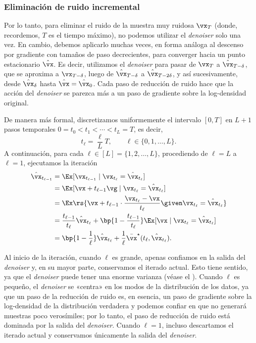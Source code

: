 \documentclass[../../book-main.tex]{subfiles}
\begin{document}
\subsubsection{Eliminación de ruido incremental}
Por lo tanto, para eliminar el ruido de la muestra muy ruidosa \(\vx_{T}\) (donde,
recordemos, \(T\) es el tiempo máximo), no podemos utilizar el \textit{denoiser} solo
una vez. En cambio, debemos aplicarlo muchas veces, en forma análoga al descenso por gradiente
con tamaños de paso decrecientes, para converger hacia un punto estacionario
\(\hat{\vx}\). Es decir, utilizamos el \textit{denoiser} para pasar de \(\vx_{T}\) a
\(\hat{\vx}_{T - \delta}\), que se aproxima a \(\vx_{T - \delta}\),
luego de \(\hat{\vx}_ {T - \delta}\) a \(\hat{\vx}_{T - 2\delta}\),
y así sucesivamente, desde \(\hat{\vx}_{\delta}\) hasta \(\hat{\vx} =
\hat{\vx}_{0}\). Cada paso de reducción de ruido hace que la acción del \textit{denoiser} 
se parezca más a un paso de gradiente sobre la log-densidad original.

De manera más formal, discretizamos uniformemente el intervalo \([0, T]\) en \(L + 1\)
pasos temporales \(0 = t_{0} < t_{1} < \cdots < t_{L} = T\), es decir,
\begin{equation}
    t_{\ell} = \frac{\ell}{L}T, \qquad \ell \in \{0, 1, \dots, L\}.
\end{equation}
A continuación, para cada \(\ell \in [L] = \{1, 2, \dots, L\}\), procediendo de
\(\ell = L\) a \(\ell = 1\), ejecutamos la iteración
\begin{align}
    \hat{\vx}_{t_{\ell - 1}}
    &= \Ex[\vx_{t_{\ell - 1}} \mid \vx_{t_{\ell}} = \hat{\vx}_{t_{\ell}}] \\
    &= \Ex[\vx + t_{\ell - 1}\vg \mid \vx_{t_{\ell}} = \hat{\vx}_{t_{\ell}}] \\
    &= \Ex\rs{\vx + t_{\ell - 1}\cdot\frac{\vx_{t_{\ell}} -
    \vx}{t_{\ell}} \given \vx_{t_{\ell}} = \hat{\vx}_{t_{\ell}}} \\
    &= \frac{t_{\ell - 1}}{t_{\ell}}\hat{\vx}_{t_{\ell}} + \bp{1 -
    \frac{t_{\ell - 1}}{t_{\ell}}}\Ex[\vx \mid \vx_{t_{\ell}} =
    \hat{\vx}_{t_{\ell}}] \\
    &= \bp{1 - \frac{1}{\ell}} \hat{\vx}_{t_{\ell}} + \frac{1}{\ell}
    \bar{\vx}^{\star}(t_{\ell}, \hat{\vx}_{t_{\ell}}). \label{eq:iter denoise}
\end{align}

Al inicio de la iteración, cuando \(\ell\) es grande, apenas
confiamos en la salida del \textit{denoiser} y, en su mayor parte, conservamos el iterado actual.
Esto tiene sentido, ya que el \textit{denoiser} puede tener una enorme varianza (véase
el ). Cuando \(\ell\) es pequeño, el
\textit{denoiser} se «centra» en los modos de la distribución de los datos, ya que un
paso de la reducción de ruido es, en esencia, un paso de gradiente sobre la
log-densidad de la distribución verdadera y podemos confiar en que no generará
muestras poco verosímiles; por lo tanto, el paso de reducción de ruido está dominada por la
salida del \textit{denoiser}. Cuando \(\ell = 1\), incluso descartamos el
iterado actual y conservamos únicamente la salida del \textit{denoiser}.
\end{document}
